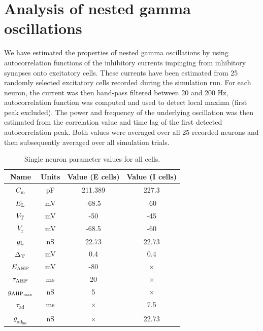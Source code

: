 \documentclass[a4paper,12pt]{article}
\newcommand{\ssc}[3]{\ensuremath{#1_{\text{#2}_{\text{#3}}}}}
\newcommand{\Cm}       {\ssc{C}      {m}     {}}
\newcommand{\gL}       {\ssc{g}      {\scriptsize{L}}  {}}
\newcommand{\EL}       {\ssc{E}      {\scriptsize{L}}  {}}
\newcommand{\gAHPmax}  {\ssc{g}      {\scriptsize{AHP}}{max}}
\newcommand{\EAHP}     {\ssc{E}      {\scriptsize{AHP}}{}}
\newcommand{\tauAHP}   {\ssc{\tau}   {\scriptsize{AHP}}{}}
\newcommand{\VT}       {\ssc{V}      {\scriptsize{T}}  {}}
\newcommand{\Vr}       {\ssc{V}      {r}     {}}
\newcommand{\tauad}    {\ssc{\tau}   {ad}{}}
\newcommand{\gadinc}   {\ssc{g}      {ad}{inc}}
\newcommand{\deltaT}   {\ssc{\Delta} {\scriptsize{T}}{}}
\begin{document}
\section{Analysis of nested gamma oscillations}

We have estimated the properties of nested gamma oscillations by using
autocorrelation functions of the inhibitory currents impinging from inhibitory
synapses onto excitatory cells. These currents have been estimated from 25
randomly selected excitatory cells recorded during the simulation run.
For each neuron, the current was then band-pass filtered between 20 and 200 Hz,
autocorrelation function was computed and used to detect local maxima (first
peak excluded). The power and frequency of the underlying oscillation was then
estimated from the correlation value and time lag of the first detected
autocorrelation peak. Both values were averaged over all 25 recorded neurons
and then subsequently averaged over all simulation trials.


\begin{table}
    \internallinenumbers
    \centering
    \begin{tabular}{| c | c | c | c |}
        \hline
        Name       & Units & Value (E cells) & Value (I cells) \\
        \hline\hline
        $\Cm$      & pF    & 211.389         & 227.3    \\
        $\EL$      & mV    & -68.5           & -60      \\
        $\VT$      & mV    & -50             & -45      \\
        $\Vr$      & mV    & -68.5           & -60      \\
        $\gL$      & nS    & 22.73           & 22.73    \\
        $\deltaT$  & mV    & 0.4             & 0.4      \\
        $\EAHP$    & mV    & -80             & $\times$ \\
        $\tauAHP$  & ms    & 20              & $\times$ \\
        $\gAHPmax$ & nS    & 5               & $\times$ \\
        $\tauad$   & ms    & $\times$        & 7.5      \\
        $\gadinc$  & nS    & $\times$        & 22.73    \\
        \hline
    \end{tabular}
    \caption{Single neuron parameter values for all cells.}
    \label{tab:params_E}
\end{table}
\end{document}
